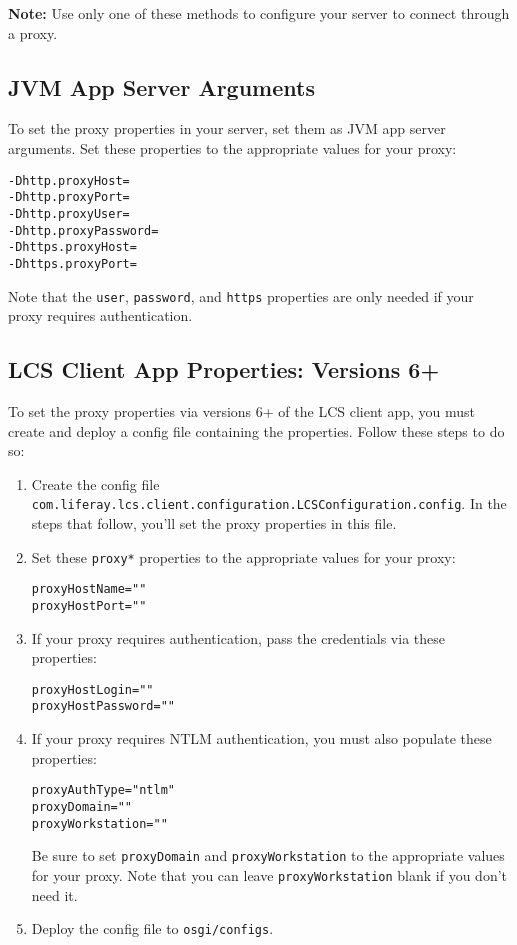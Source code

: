 \noindent\hrulefill

\textbf{Note:} Use only one of these methods to configure your server to
connect through a proxy.

\noindent\hrulefill

\subsection{JVM App Server Arguments}\label{jvm-app-server-arguments}

To set the proxy properties in your server, set them as JVM app server
arguments. Set these properties to the appropriate values for your
proxy:

\begin{verbatim}
-Dhttp.proxyHost=
-Dhttp.proxyPort=
-Dhttp.proxyUser=
-Dhttp.proxyPassword=
-Dhttps.proxyHost=
-Dhttps.proxyPort=
\end{verbatim}

Note that the \texttt{user}, \texttt{password}, and \texttt{https}
properties are only needed if your proxy requires authentication.

\subsection{LCS Client App Properties: Versions
6+}\label{lcs-client-app-properties-versions-6}

To set the proxy properties via versions 6+ of the LCS client app, you
must create and deploy a config file containing the properties. Follow
these steps to do so:

\begin{enumerate}
\def\labelenumi{\arabic{enumi}.}
\item
  Create the config file
  \texttt{com.liferay.lcs.client.configuration.LCSConfiguration.config}.
  In the steps that follow, you'll set the proxy properties in this
  file.
\item
  Set these \texttt{proxy*} properties to the appropriate values for
  your proxy:

\begin{verbatim}
proxyHostName=""
proxyHostPort=""
\end{verbatim}
\item
  If your proxy requires authentication, pass the credentials via these
  properties:

\begin{verbatim}
proxyHostLogin=""
proxyHostPassword=""
\end{verbatim}
\item
  If your proxy requires NTLM authentication, you must also populate
  these properties:

\begin{verbatim}
proxyAuthType="ntlm"
proxyDomain=""
proxyWorkstation=""
\end{verbatim}

  Be sure to set \texttt{proxyDomain} and \texttt{proxyWorkstation} to
  the appropriate values for your proxy. Note that you can leave
  \texttt{proxyWorkstation} blank if you don't need it.
\item
  Deploy the config file to \texttt{osgi/configs}.
\end{enumerate}

